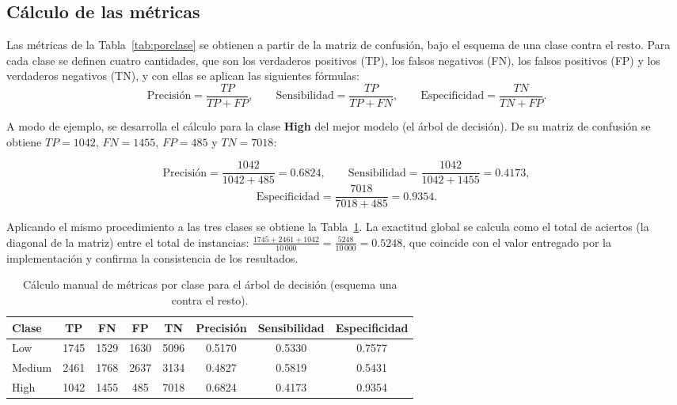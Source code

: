 \documentclass[11pt,letterpaper,twoside]{article}
\begin{document}
\subsection{Cálculo de las métricas}
Las métricas de la Tabla~\ref{tab:porclase} se obtienen a partir de la matriz de confusión, bajo el esquema de una clase contra el resto. Para cada clase se definen cuatro cantidades, que son los verdaderos positivos (TP), los falsos negativos (FN), los falsos positivos (FP) y los verdaderos negativos (TN), y con ellas se aplican las siguientes fórmulas:
\begin{equation}
\text{Precisión} = \frac{TP}{TP+FP}, \qquad
\text{Sensibilidad} = \frac{TP}{TP+FN}, \qquad
\text{Especificidad} = \frac{TN}{TN+FP}.
\label{eq:metricas}
\end{equation}

A modo de ejemplo, se desarrolla el cálculo para la clase \textbf{High} del mejor modelo (el árbol de decisión). De su matriz de confusión se obtiene $TP=1042$, $FN=1455$, $FP=485$ y $TN=7018$:

\begin{resultado}
\[
\text{Precisión} = \frac{1042}{1042+485} = 0.6824, \qquad
\text{Sensibilidad} = \frac{1042}{1042+1455} = 0.4173,
\]
\[
\text{Especificidad} = \frac{7018}{7018+485} = 0.9354.
\]
\end{resultado}

Aplicando el mismo procedimiento a las tres clases se obtiene la Tabla~\ref{tab:manualarbol}. La exactitud global se calcula como el total de aciertos (la diagonal de la matriz) entre el total de instancias: $\tfrac{1745+2461+1042}{10\,000}=\tfrac{5248}{10\,000}=0.5248$, que coincide con el valor entregado por la implementación y confirma la consistencia de los resultados.

\begin{table}[H]
\centering
\caption{Cálculo manual de métricas por clase para el árbol de decisión (esquema una contra el resto).}
\label{tab:manualarbol}
\begin{tabular}{lccccccc}
\toprule
\textbf{Clase} & \textbf{TP} & \textbf{FN} & \textbf{FP} & \textbf{TN} & \textbf{Precisión} & \textbf{Sensibilidad} & \textbf{Especificidad} \\
\midrule
Low    & 1745 & 1529 & 1630 & 5096 & 0.5170 & 0.5330 & 0.7577 \\
Medium & 2461 & 1768 & 2637 & 3134 & 0.4827 & 0.5819 & 0.5431 \\
High   & 1042 & 1455 &  485 & 7018 & 0.6824 & 0.4173 & 0.9354 \\
\bottomrule
\end{tabular}
\end{table}
\end{document}
